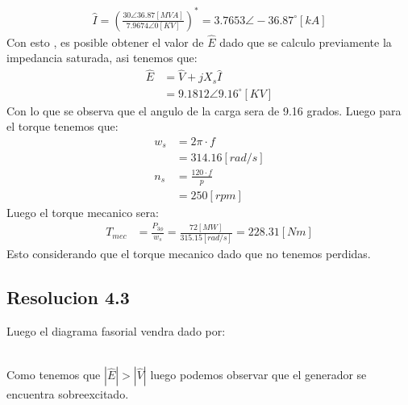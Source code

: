 \documentclass[
  11pt,
  letterpaper,
   addpoints,
   answers
  ]{exam}
\begin{document}
\begin{questions}
\begin{solution}
\begin{align}
        \hat{I} = \left(\frac{30 \angle 36.87 [MVA]}{7.9674\angle 0 [ KV]}\right)^{*} = 3.7653 \angle -36.87^{\circ} [kA]
    \end{align}
    Con esto , es posible obtener el valor de $\hat{E}$ dado que se calculo previamente la impedancia saturada, asi tenemos que:
    \begin{align}
        \hat{E} &= \hat{V} + jX_{s}\hat{I}\\
               &= 9.1812\angle 9.16^{\circ} [KV]
    \end{align}
    Con lo que se observa que el angulo de la carga sera de 9.16 grados. Luego para el torque tenemos que:
    \begin{align}
        w_{s} &= 2\pi \cdot f\\
             & = 314.16 [rad/s]\\
        n_{s} &= \frac{120 \cdot f}{p}\\
              &= 250 [rpm] 
    \end{align}
    Luego el torque mecanico sera:
    \begin{align}
        T_{mec} &= \frac{P_{3\phi}}{w_{s}} = \frac{72 [MW]}{315.15[rad/s]} = 228.31 [Nm]
    \end{align}
    Esto considerando que el torque mecanico dado que no tenemos perdidas.
    \subsection*{Resolucion 4.3}
    Luego el diagrama fasorial vendra dado por:\\\\
    \begin{center}
    \end{center}
    Como tenemos que $|\hat{E}| > |\hat{V}|$ luego podemos observar que el generador se encuentra sobreexcitado.
\end{solution}
\end{questions}
\newpage
\end{document}
